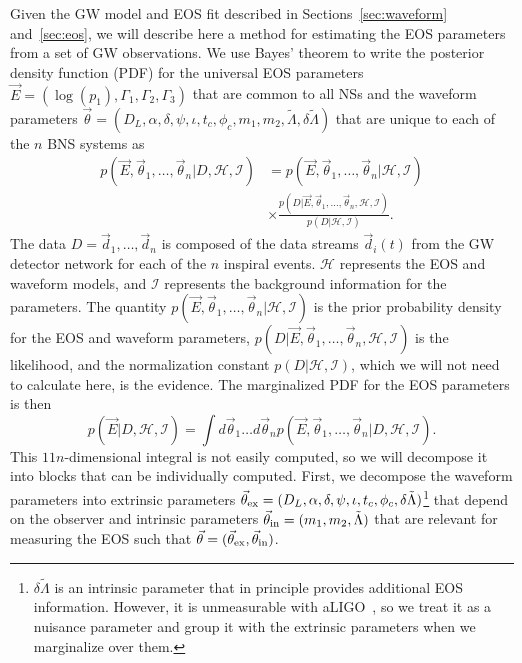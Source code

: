 \documentclass[twocolumn,prd,amssymb,aps,nofootinbib,showpacs,epsf]{revtex4}
\begin{document}
Given the GW model and EOS fit described in Sections~\ref{sec:waveform} and~\ref{sec:eos}, we will describe here a method for estimating the EOS parameters from a set of GW observations. We use Bayes' theorem to write the posterior density function (PDF) for the universal EOS parameters $\vec E = (\log(p_1), \Gamma_1, \Gamma_2, \Gamma_3)$ that are common to all NSs and the waveform parameters $\vec\theta = (D_L, \alpha, \delta, \psi, \iota, t_c, \phi_c, m_1, m_2, \tilde\Lambda, \delta\tilde\Lambda)$ that are unique to each of the $n$ BNS systems as
\begin{equation}
\begin{split}
p(\vec E,\vec\theta_1,\dots,\vec\theta_n | D,\mathcal{H},\mathcal{I})
&= p(\vec E,\vec\theta_1,\dots,\vec\theta_n | \mathcal{H},\mathcal{I}) \\
& \times\frac{ p(D | \vec E,\vec\theta_1,\dots,\vec\theta_n,\mathcal{H},\mathcal{I}) }{ p(D | \mathcal{H},\mathcal{I}) }.
\end{split}
\end{equation}
The data $D = \vec d_1,\dots, \vec d_n$ is composed of the data streams $\vec d_i(t)$ from the GW detector network for each of the $n$ inspiral events. $\mathcal{H}$ represents the EOS and waveform models, and $\mathcal{I}$ represents the background information for the parameters. The quantity $p(\vec E,\vec\theta_1,\dots,\vec\theta_n | \mathcal{H},\mathcal{I})$ is the prior probability density for the EOS and waveform parameters, $p(D | \vec E,\vec\theta_1,\dots,\vec\theta_n,\mathcal{H},\mathcal{I})$ is the likelihood, and the normalization constant $p(D | \mathcal{H},\mathcal{I})$, which we will not need to calculate here, is the evidence. The marginalized PDF for the EOS parameters is then
\begin{equation}
\label{eq:margEOS}
p(\vec E | D,\mathcal{H},\mathcal{I}) = \int d\vec\theta_1 \dots d\vec\theta_n p(\vec E,\vec\theta_1,\dots,\vec\theta_n | D,\mathcal{H},\mathcal{I}).
\end{equation}
This $11n$-dimensional integral is not easily computed, so we will decompose it into blocks that can be individually computed. First, we decompose the waveform parameters into extrinsic parameters $\vec\theta_{\rm ex} = (D_L, \alpha, \delta, \psi, \iota, t_c, \phi_c, \delta\tilde\Lambda)$\footnote{$\delta\tilde\Lambda$ is an intrinsic parameter that in principle provides additional EOS information. However, it is unmeasurable with aLIGO~\cite{WadeCreightonOchsner2014}, so we treat it as a nuisance parameter and group it with the extrinsic parameters when we marginalize over them.} that depend on the observer and intrinsic parameters $\vec\theta_{\rm in} = (m_1, m_2, \tilde\Lambda)$ that are relevant for measuring the EOS such that $\vec\theta = (\vec\theta_{\rm ex}, \vec\theta_{\rm in})$.
\end{document}
